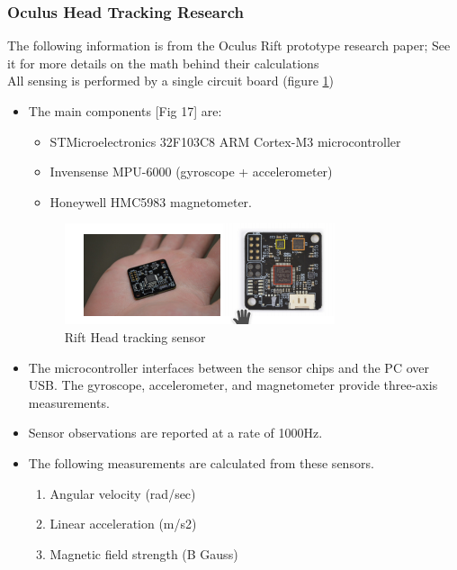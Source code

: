 \documentclass[a4paper,10pt]{article}
\begin{document}
\subsubsection{Oculus Head Tracking Research}
The following information is from the Oculus Rift prototype research paper; See it for more details on the math behind their calculations \cite{riftPaper}~\\
All sensing is performed by a single circuit board (figure \ref{fig:magnetsHowDoTheyWork}) 
\begin{itemize}
\item The main components [Fig 17] are:
\begin{itemize}
\item STMicroelectronics 32F103C8 ARM Cortex-M3 microcontroller
\item Invensense MPU-6000 (gyroscope + accelerometer)
\item Honeywell HMC5983 magnetometer.
\end{itemize}
\begin{figure}[H]
	\centerline{\includegraphics[]{riftMagnets.png}}
	\caption{Rift Head tracking sensor}
	\label{fig:magnetsHowDoTheyWork}
	\end{figure}
	

\item The microcontroller interfaces between the sensor chips
and the PC over USB. The gyroscope, accelerometer, and magnetometer provide three-axis measurements.

\item Sensor observations are reported at a rate of 1000Hz.
\item The following measurements are calculated from these sensors.
  \begin{enumerate}
  \item Angular velocity (rad/sec)
  \item Linear acceleration (m/s2)
  \item Magnetic field strength (B Gauss)
  \end{enumerate}
\end{itemize}
\end{document}
